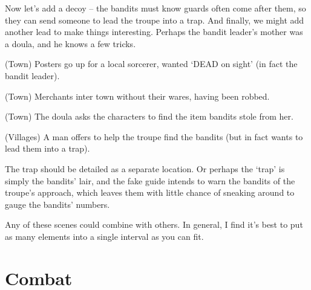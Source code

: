 \begin{multicols}{2}
\noindent
Now let's add a decoy -- the bandits must know \glspl{guard} often come after them, so they can send someone to lead the troupe into a trap.
And finally, we might add another lead to make things interesting.
Perhaps the bandit leader's mother was a doula, and he knows a few tricks.

\begin{list}{\sqn}{}
  \item
  (Town)
  Posters go up for a local sorcerer, wanted `DEAD on sight' (in fact the bandit leader).
  \item
  (Town) 
  Merchants inter town without their wares, having been robbed.
  \item
  (Town)
  The doula asks the characters to find the item bandits stole from her.
  \item
  (Villages)
  A man offers to help the troupe find the bandits (but in fact wants to lead them into a trap).
\end{list}

\noindent
The trap should be detailed as a separate location.
Or perhaps the `trap' is simply the bandits' lair, and the fake guide intends to warn the bandits of the troupe's approach, which leaves them with little chance of sneaking around to gauge the bandits' numbers.

Any of these scenes could combine with others.
In general, I find it's best to put as many elements into a single \gls{interval} as you can fit.

\end{multicols}

\section{Combat}

